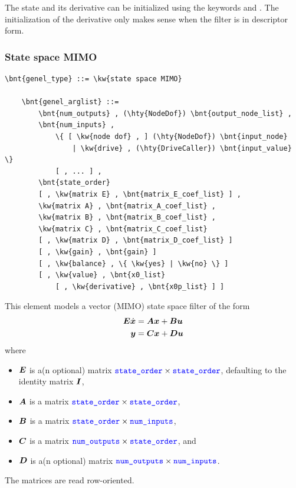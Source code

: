 The state and its derivative can be initialized using the keywords 
and .
The initialization of the derivative only makes sense when the filter
is in descriptor form.

\subsubsection{State space MIMO}
\label{sec:EL:GENEL:STATE-SPACE-MIMO}
\begin{Verbatim}[commandchars=\\\{\}]
    \bnt{genel_type} ::= \kw{state space MIMO}

    \bnt{genel_arglist} ::=
        \bnt{num_outputs} , (\hty{NodeDof}) \bnt{output_node_list} ,
        \bnt{num_inputs} ,
            \{ [ \kw{node dof} , ] (\hty{NodeDof}) \bnt{input_node}
                | \kw{drive} , (\hty{DriveCaller}) \bnt{input_value} \}
            [ , ... ] ,
        \bnt{state_order}
        [ , \kw{matrix E} , \bnt{matrix_E_coef_list} ] ,
        \kw{matrix A} , \bnt{matrix_A_coef_list} ,
        \kw{matrix B} , \bnt{matrix_B_coef_list} ,
        \kw{matrix C} , \bnt{matrix_C_coef_list}
        [ , \kw{matrix D} , \bnt{matrix_D_coef_list} ]
        [ , \kw{gain} , \bnt{gain} ]
        [ , \kw{balance} , \{ \kw{yes} | \kw{no} \} ]
        [ , \kw{value} , \bnt{x0_list}
            [ , \kw{derivative} , \bnt{x0p_list} ] ]
\end{Verbatim}
This element models a vector (MIMO) state space filter of the form
\begin{align*}
        \boldsymbol{E} \dot{\boldsymbol{x}} &= \boldsymbol{A}\boldsymbol{x}+\boldsymbol{B}\boldsymbol{u} \\
	\boldsymbol{y} &= \boldsymbol{C}\boldsymbol{x}+\boldsymbol{D}\boldsymbol{u}
\end{align*}
where
\begin{itemize}
\item $\boldsymbol{E}$ is a(n optional) matrix
	$\textcolor{blue}{\texttt{state\_order}} \times \textcolor{blue}{\texttt{state\_order}}$, defaulting to the identity matrix $\boldsymbol{I}$,
\item $\boldsymbol{A}$ is a matrix
	$\textcolor{blue}{\texttt{state\_order}} \times \textcolor{blue}{\texttt{state\_order}}$,
\item $\boldsymbol{B}$ is a matrix
	$\textcolor{blue}{\texttt{state\_order}} \times \textcolor{blue}{\texttt{num\_inputs}}$,
\item $\boldsymbol{C}$ is a matrix
	$\textcolor{blue}{\texttt{num\_outputs}} \times \textcolor{blue}{\texttt{state\_order}}$, and
\item $\boldsymbol{D}$ is a(n optional) matrix
	$\textcolor{blue}{\texttt{num\_outputs}} \times \textcolor{blue}{\texttt{num\_inputs}}$.
\end{itemize}
The matrices are read row-oriented.

